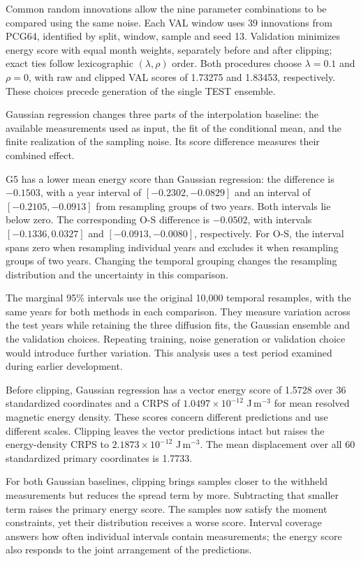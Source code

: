 \documentclass{article}
\begin{document}
Common random innovations allow the nine parameter combinations to be compared using the same noise. Each VAL window uses 39 innovations from PCG64, identified by split, window, sample and seed 13. Validation minimizes energy score with equal month weights, separately before and after clipping; exact ties follow lexicographic $(\lambda,\rho)$ order. Both procedures choose $\lambda=0.1$ and $\rho=0$, with raw and clipped VAL scores of 1.73275 and 1.83453, respectively. These choices precede generation of the single TEST ensemble.

Gaussian regression changes three parts of the interpolation baseline: the available measurements used as input, the fit of the conditional mean, and the finite realization of the sampling noise. Its score difference measures their combined effect.

G5 has a lower mean energy score than Gaussian regression: the difference is $-0.1503$, with a year interval of $[-0.2302,-0.0829]$ and an interval of $[-0.2105,-0.0913]$ from resampling groups of two years. Both intervals lie below zero. The corresponding O-S difference is $-0.0502$, with intervals $[-0.1336,0.0327]$ and $[-0.0913,-0.0080]$, respectively. For O-S, the interval spans zero when resampling individual years and excludes it when resampling groups of two years. Changing the temporal grouping changes the resampling distribution and the uncertainty in this comparison.

The marginal 95\% intervals use the original 10{,}000 temporal resamples, with the same years for both methods in each comparison. They measure variation across the test years while retaining the three diffusion fits, the Gaussian ensemble and the validation choices. Repeating training, noise generation or validation choice would introduce further variation. This analysis uses a test period examined during earlier development.

Before clipping, Gaussian regression has a vector energy score of 1.5728 over 36 standardized coordinates and a CRPS of $1.0497\times10^{-12}$ J\,m$^{-3}$ for mean resolved magnetic energy density. These scores concern different predictions and use different scales. Clipping leaves the vector predictions intact but raises the energy-density CRPS to $2.1873\times10^{-12}$ J\,m$^{-3}$. The mean displacement over all 60 standardized primary coordinates is 1.7733.

For both Gaussian baselines, clipping brings samples closer to the withheld measurements but reduces the spread term by more. Subtracting that smaller term raises the primary energy score. The samples now satisfy the moment constraints, yet their distribution receives a worse score. Interval coverage answers how often individual intervals contain measurements; the energy score also responds to the joint arrangement of the predictions.
\end{document}
